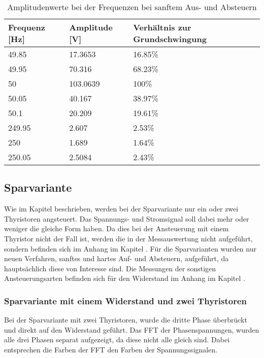 \begin{table}[ht!]
	\centering
	\begin{tabular}{|l|l|l|}
		\hline
		Frequenz {[}Hz{]} & Amplitude {[}V{]} & Verhältnis zur Grundschwingung \\ \hline
		49.85             & 17.3653           & 16.85\%                        \\ \hline
		49.95             & 70.316            & 68.23\%                        \\ \hline
		50                & 103.0639          & 100\%                          \\ \hline
		50.05             & 40.167            & 38.97\%                        \\ \hline
		50.1              & 20.209            & 19.61\%                        \\ \hline
		249.95            & 2.607             & 2.53\%                         \\ \hline
		250               & 1.689             & 1.64\%                         \\ \hline
		250.05            & 2.5084            & 2.43\%                         \\ \hline
	\end{tabular}
\caption{Amplitudenwerte bei der Frequenzen bei sanftem Aus- und Absteuern}\label{tab:Mess_Spannung_ASM_AufAb_sanft}
\end{table}


\newpage
\subsection{Sparvariante}
Wie im Kapitel  beschrieben, werden bei der Sparvariante nur ein oder zwei Thyristoren angsteuert. Das Spannungs- und Stromsignal soll dabei mehr oder weniger die gleiche Form haben. Da dies bei der Ansteuerung mit einem Thyristor nicht der Fall ist, werden die in der Messauswertung nicht aufgeführt, sondern befinden sich im Anhang im Kapitel . Für die Sparvarianten wurden nur neuen Verfahren, sanftes und hartes Auf- und Absteuern, aufgeführt, da hauptsächlich diese von Interesse sind. Die Messungen der sonstigen Ansteuerungsarten befinden sich für den Widerstand im Anhang im Kapitel .


\subsubsection{Sparvariante mit einem Widerstand und zwei Thyristoren}
Bei der Sparvariante mit zwei Thyristoren, wurde die dritte Phase überbrückt und direkt auf den Widerstand geführt. Das FFT der Phasenspannungen, wurden alle drei Phasen separat aufgezeigt, da diese nicht alle gleich sind. Dabei entsprechen die Farben der FFT den Farben der Spannungssignalen.


